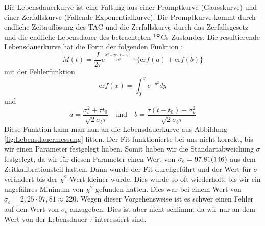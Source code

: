 Die Lebensdauerkurve ist eine Faltung aus einer Promptkurve (Gausskurve) und einer Zerfallskurve (Fallende Exponentialkurve).
Die Promptkurve kommt durch endliche Zeitauflösung des TAC und die Zerfallskurve durch das Zerfallsgesetz und die endliche Lebensdauer des betrachteten $^{133}$Cs-Zustandes.
Die resultierende Lebensdauerkurve hat die Form der folgenden Funktion \cite{Anleitung}:
\begin{equation}
    M (t) = \frac{I}{2 \tau} e^{\frac{\sigma^2 - 2 \tau (t - t_0)}{2 \tau^2}} \cdot \{\text{er} f(a) + \text{er} f(b)\}
    \label{eq:LebensdauerFitFunktion}
\end{equation}
mit der Fehlerfunktion
\begin{equation}
    \text{er} f(x) = \int_{0}^{x} e^{-y^2} dy
    \label{eq:LebensdauerFehlerfunktion}
\end{equation}
und
\begin{equation}
    a = \frac{\sigma_b^2 + \tau t_0}{\sqrt{2} \sigma_b \tau}
    \quad \text{und} \quad
    b = \frac{\tau (t - t_0) - \sigma_b^2}{\sqrt{2} \sigma_b \tau}
    \label{eq:LebensdauerAB}
\end{equation}
Diese Funktion kann man nun an die Lebensdauerkurve aus Abbildung \ref{fig:Lebensdauermessung} fitten.
Der Fit funktionierte bei uns nicht korrekt, bis wir einen Parameter festgelegt haben.
Somit haben wir die Standartabweichung $\sigma$ festgelegt, da wir für diesen Parameter einen Wert von $\sigma_b = \SI{97,81 \pm 1,46}{}$ aus dem Zeitkalibrationsteil hatten.
Dann wurde der Fit durchgeführt und der Wert für $\sigma$ verändert bis der $\chi^2$-Wert kleiner wurde.
Dies wurde so oft wiederholt, bis wir ein ungefähres Minimum von $\chi^2$ gefunden hatten.
Dies war bei einem Wert von $\sigma_b = 2,25 \cdot 97,81 \approx 220$.
Wegen dieser Vorgehensweise ist es schwer einen Fehler auf den Wert von $\sigma_b$ anzugeben.
Dies ist aber nicht schlimm, da wir nur an dem Wert von der Lebensdauer $\tau$ interessiert sind.

